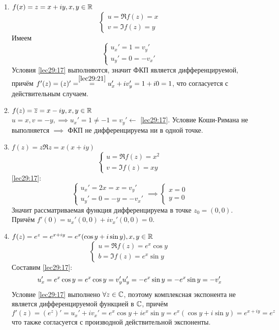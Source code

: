 \documentclass[../../main.tex]{subfiles}
\begin{document}
\begin{exmps}
\begin{enumerate}
	\item $ f(x) = z = x + iy, x, y \in \mathbb{R} $
	\[
	\begin{cases}
		u = \Re f(z) = x\\
		v = \Im f(z) = y
	\end{cases}
	\]
	Имеем 
	\[
	\begin{cases}
		u_x' = 1 = v_y'\\
		u_y' = 0 = -v_x'
	\end{cases}
	\]
	Условия \eqref{lec29:17} выполняются, значит ФКП является дифференцируемой,
	причём $ f'(z) = (z)' = \stackrel{\eqref{lec29:21}}{=} u_x' + iv_y' = 
	1 + i0 = 1 $, что согласуется с действительным случаем.
	\item $ f(z) = \overline{z} = x - iy, x, y \in \mathbb{R} $\\
	$ u = x, v = -y, \implies u_x' = 1 \neq -1 = v_y' \leftarrow $ 
	\eqref{lec29:17}. Условие Коши-Римана не выполняется $ \implies $ ФКП 
	не дифференцируема ни в одной точке.
	\item $ f(z) = z \Re z = x(x + iy) $
	\[
	\begin{cases}
		u = \Re f(z) = x^2\\
		v = \Im f(z) = xy
	\end{cases}
	\]
	\eqref{lec29:17}:
	\[
	\begin{cases}
		u_x' = 2x = x = v_y'\\
		u_y' = 0 = -y = -v_x'
	\end{cases} \implies
	\begin{cases}
		x = 0\\
		y = 0
	\end{cases}
	\]
	Значит рассматриваемая функция дифференцируема в точке $ z_0 = (0, 0) $.
	Причём
	$ f'(0) = u_x'(0, 0) + iv_x'(0, 0) = 0 $.
	\item $ f(z) = e^z = e^{x + iy} = e^x(\cos y + i\sin y), x, y \in \mathbb{R} $\\
	\[
	\begin{cases}
		u = \Re f(z) = e^x \cos y\\
		b = \Im f(z) = e^x \sin y
	\end{cases}
	\]
	Составим \eqref{lec29:17}:
	\[
	u_x' = e^x \cos y = e^x \cos y = v_y'\\
	u_y' = -e^x \sin y = -e^x \sin y = -v_x'
	\]
	Условие \eqref{lec29:17} выполнено $ \forall z \in \mathbb{C} $, 
	поэтому комплексная экспонента не является дифференцируемой функцией в $ \mathbb{C} 
	$, причём
	\[
	f'(z) = (e^z)' = u_x' + iv_x' = e^x \cos y + ie^x \sin y =
	e^x(\cos y + i\sin y) = e^{x + iy} = e^z
	\]
	что также согласуется с производной действительной экспоненты.
\end{enumerate}
\end{exmps}
\end{document}
